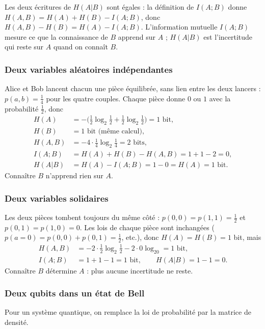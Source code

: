 Les deux écritures de $H(A|B)$ sont égales : la définition de $I(A;B)$ donne
$H(A,B)=H(A)+H(B)-I(A;B)$, donc $H(A,B)-H(B)=H(A)-I(A;B)$. L'information mutuelle $I(A;B)$
mesure ce que la connaissance de $B$ apprend sur $A$ ; $H(A|B)$ est l'incertitude qui reste sur
$A$ quand on connaît $B$.

\subsubsection{Deux variables aléatoires indépendantes}

Alice et Bob lancent chacun une pièce équilibrée, sans lien entre les deux lancers :
$p(a,b)=\frac14$ pour les quatre couples. Chaque pièce donne $0$ ou $1$ avec la probabilité $\frac12$, donc
\begin{align*}
  H(A)&=-\Big(\tfrac12\log_2\tfrac12+\tfrac12\log_2\tfrac12\Big)=1\text{ bit},\\
  H(B)&=1\text{ bit (même calcul)},\\
  H(A,B)&=-4\cdot\tfrac14\log_2\tfrac14=2\text{ bits},\\
  I(A;B)&=H(A)+H(B)-H(A,B)=1+1-2=0,\\
  H(A|B)&=H(A)-I(A;B)=1-0=H(A)=1\text{ bit}.
\end{align*}
Connaître $B$ n'apprend rien sur $A$.

\subsubsection{Deux variables solidaires}

Les deux pièces tombent toujours du même côté : $p(0,0)=p(1,1)=\frac12$ et
$p(0,1)=p(1,0)=0$. Les lois de chaque pièce sont inchangées ($p(a{=}0)=p(0,0)+p(0,1)=\frac12$,
etc.), donc $H(A)=H(B)=1$ bit, mais
\begin{align*}
  H(A,B)&=-2\cdot\tfrac12\log_2\tfrac12-2\cdot0\log_20=1\text{ bit},\\
  I(A;B)&=1+1-1=1\text{ bit},\qquad H(A|B)=1-1=0.
\end{align*}
Connaître $B$ détermine $A$ : plus aucune incertitude ne reste.

\subsubsection{Deux qubits dans un état de Bell}

Pour un système quantique, on remplace la loi de probabilité par la matrice de densité.

